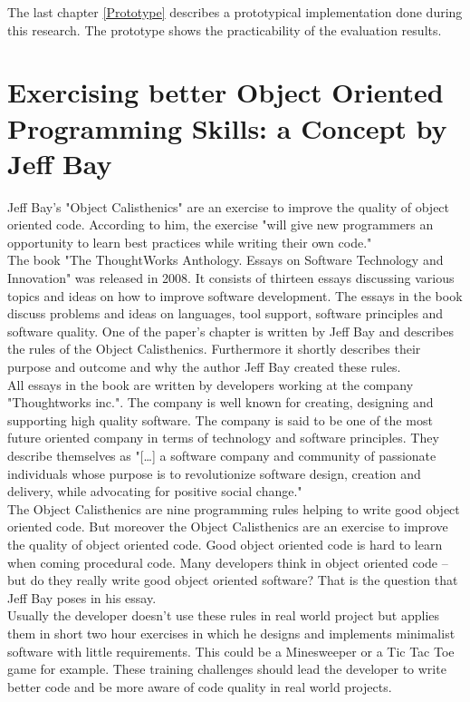 The last chapter \ref{Prototype} describes a prototypical implementation done during this research. The prototype shows the practicability of the evaluation results.

\section{Exercising better Object Oriented Programming Skills: a Concept by Jeff Bay}
\label{i:exercising}
Jeff Bay's "Object Calisthenics" \cite{oc2008} are an exercise to improve the quality of object oriented code. According to him, the exercise "will give new programmers an opportunity to learn best practices while writing their own code." \cite[p. 70]{oc2008}\\

The book "The ThoughtWorks Anthology. Essays on Software Technology and Innovation" \cite[p. 70-79]{oc2008} was released in 2008. It consists of thirteen essays discussing various topics and ideas on how to improve software development. The essays in the book discuss problems and ideas on languages, tool support, software principles and software quality. One of the paper's chapter is written by Jeff Bay and describes the rules of the Object Calisthenics. Furthermore it shortly describes their purpose and outcome and why the author Jeff Bay created these rules.\\

All essays in the book \cite{oc2008} are written by developers working at the company "Thoughtworks inc.". The company is well known for creating, designing and supporting high quality software. The company is said to be one of the most future oriented company in terms of technology and software principles. They describe themselves as "[\dots] a software company and community of passionate individuals whose purpose is to revolutionize software design, creation and delivery, while advocating for positive social change." \cite{twWeb}\\

The Object Calisthenics are nine programming rules helping to write good object oriented code. But moreover the Object Calisthenics are an exercise to improve the quality of object oriented code. Good object oriented code is hard to learn when coming procedural code. Many developers think in object oriented code -- but do they really write good object oriented software? That is the question that Jeff Bay poses in his essay.\\

Usually the developer doesn't use these rules in real world project but applies them in short two hour exercises in which he designs and implements minimalist software with little requirements. This could be a Minesweeper or a Tic Tac Toe game for example. These training challenges should lead the developer to write better code and be more aware of code quality in real world projects.\\


